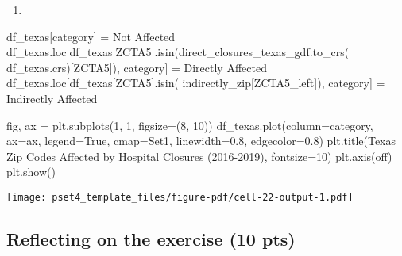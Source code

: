 \documentclass[
  letterpaper,
  DIV=11,
  numbers=noendperiod]{scrartcl}
\newenvironment{Shaded}{\begin{snugshade}}{\end{snugshade}}
\newcommand{\DecValTok}[1]{\textcolor[rgb]{0.68,0.00,0.00}{#1}}
\newcommand{\FloatTok}[1]{\textcolor[rgb]{0.68,0.00,0.00}{#1}}
\newcommand{\NormalTok}[1]{\textcolor[rgb]{0.00,0.23,0.31}{#1}}
\newcommand{\OperatorTok}[1]{\textcolor[rgb]{0.37,0.37,0.37}{#1}}
\newcommand{\StringTok}[1]{\textcolor[rgb]{0.13,0.47,0.30}{#1}}
\newcommand{\VariableTok}[1]{\textcolor[rgb]{0.07,0.07,0.07}{#1}}
\providecommand{\tightlist}{%
  \setlength{\itemsep}{0pt}\setlength{\parskip}{0pt}}\usepackage{longtable,booktabs,array}
\begin{document}
\begin{enumerate}
\def\labelenumi{\arabic{enumi}.}
\setcounter{enumi}{3}
\tightlist
\item
\end{enumerate}

\begin{Shaded}
\begin{Highlighting}[]
\NormalTok{df\_texas[}\StringTok{\textquotesingle{}category\textquotesingle{}}\NormalTok{] }\OperatorTok{=} \StringTok{\textquotesingle{}Not Affected\textquotesingle{}}
\NormalTok{df\_texas.loc[df\_texas[}\StringTok{\textquotesingle{}ZCTA5\textquotesingle{}}\NormalTok{].isin(direct\_closures\_texas\_gdf.to\_crs(}
\NormalTok{    df\_texas.crs)[}\StringTok{\textquotesingle{}ZCTA5\textquotesingle{}}\NormalTok{]), }\StringTok{\textquotesingle{}category\textquotesingle{}}\NormalTok{] }\OperatorTok{=} \StringTok{\textquotesingle{}Directly Affected\textquotesingle{}}
\NormalTok{df\_texas.loc[df\_texas[}\StringTok{\textquotesingle{}ZCTA5\textquotesingle{}}\NormalTok{].isin(}
\NormalTok{    indirectly\_zip[}\StringTok{\textquotesingle{}ZCTA5\_left\textquotesingle{}}\NormalTok{]), }\StringTok{\textquotesingle{}category\textquotesingle{}}\NormalTok{] }\OperatorTok{=} \StringTok{\textquotesingle{}Indirectly Affected\textquotesingle{}}

\NormalTok{fig, ax }\OperatorTok{=}\NormalTok{ plt.subplots(}\DecValTok{1}\NormalTok{, }\DecValTok{1}\NormalTok{, figsize}\OperatorTok{=}\NormalTok{(}\DecValTok{8}\NormalTok{, }\DecValTok{10}\NormalTok{))}
\NormalTok{df\_texas.plot(column}\OperatorTok{=}\StringTok{\textquotesingle{}category\textquotesingle{}}\NormalTok{, ax}\OperatorTok{=}\NormalTok{ax, legend}\OperatorTok{=}\VariableTok{True}\NormalTok{,}
\NormalTok{              cmap}\OperatorTok{=}\StringTok{\textquotesingle{}Set1\textquotesingle{}}\NormalTok{, linewidth}\OperatorTok{=}\FloatTok{0.8}\NormalTok{, edgecolor}\OperatorTok{=}\StringTok{\textquotesingle{}0.8\textquotesingle{}}\NormalTok{)}
\NormalTok{plt.title(}\StringTok{\textquotesingle{}Texas Zip Codes Affected by Hospital Closures (2016{-}2019)\textquotesingle{}}\NormalTok{, fontsize}\OperatorTok{=}\DecValTok{10}\NormalTok{)}
\NormalTok{plt.axis(}\StringTok{\textquotesingle{}off\textquotesingle{}}\NormalTok{)}
\NormalTok{plt.show()}
\end{Highlighting}
\end{Shaded}

\texttt{[image: pset4\_template\_files/figure-pdf/cell-22-output-1.pdf]}

\subsection{Reflecting on the exercise (10
pts)}\label{reflecting-on-the-exercise-10-pts}
\end{document}
